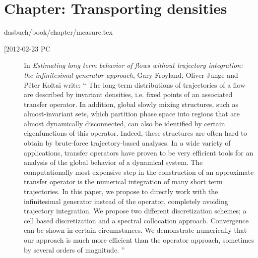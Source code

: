 %
%
%

\section{Chapter: Transporting densities}
\label{c-measure}\noindent dasbuch/book/chapter/measure.tex
\begin{description}

\item[[2012-02-23 PC]
In \emph{Estimating long term behavior of flows without trajectory
integration: the infinitesimal generator approach}, 
Gary Froyland, Oliver Junge and P\'eter Koltai write:
``
The long-term distributions of trajectories of a flow are described by
invariant densities, i.e. fixed points of an associated transfer
operator. In addition, global slowly mixing structures, such as
almost-invariant sets, which partition phase space into regions that are
almost dynamically disconnected, can also be identified by certain
eigenfunctions of this operator. Indeed, these structures are often hard
to obtain by brute-force trajectory-based analyses. In a wide variety of
applications, transfer operators have proven to be very efficient tools
for an analysis of the global behavior of a dynamical system.
The computationally most expensive step in the construction of an
approximate transfer operator is the numerical integration of many short
term trajectories. In this paper, we propose to directly work with the
infinitesimal generator instead of the operator, completely avoiding
trajectory integration. We propose two different discretization schemes;
a cell based discretization and a spectral collocation approach.
Convergence can be shown in certain circumstances. We demonstrate
numerically that our approach is much more efficient than the operator
approach, sometimes by several orders of magnitude.
''

\end{description}

